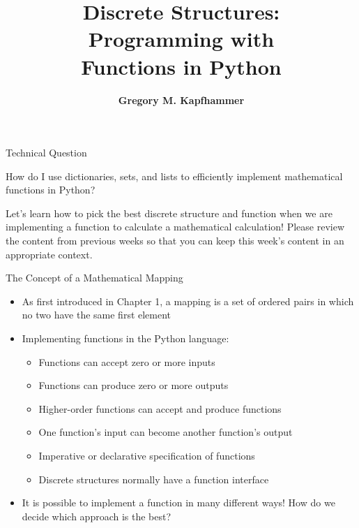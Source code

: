 \documentclass[14pt,aspectratio=169]{beamer}
\title{Discrete Structures: \\ Programming with \\ Functions in Python}
\author{{\bf Gregory M. Kapfhammer}}
\institute[shortinst]{{\bf Department of Computer Science, Allegheny College}}
\begin{document}
{
  \begin{frame}
    \titlepage
  \end{frame}
}

%
\begin{frame}{Technical Question}
  \hspace*{.5in}
  \begin{minipage}{4.3in}
    \vspace*{.1in}
    \begin{center}
      {\large How do I use dictionaries, sets, and lists to efficiently
      implement mathematical functions in Python?}
    \end{center}
  \end{minipage}
  \vspace{2ex}
  \begin{center}
    \small Let's learn how to pick the best discrete structure and function when
    we are implementing a function to calculate a mathematical calculation!
    Please review the content from previous weeks so that you can keep this
    week's content in an appropriate context.
  \end{center}
\end{frame}

%
\begin{frame}{The Concept of a Mathematical Mapping}
  \begin{itemize}
    \item As first introduced in Chapter 1, a mapping is a set of ordered pairs
      in which no two have the same first element
      \vspace*{-.15in}
    \item Implementing functions in the Python language:
      \begin{itemize}
        \item Functions can accept zero or more inputs
        \item Functions can produce zero or more outputs
        \item Higher-order functions can accept and produce functions
        \item One function's input can become another function's output
        \item Imperative or declarative specification of functions
        \item Discrete structures normally have a function interface
      \end{itemize}
      \vspace*{-.2in}
    \item It is possible to implement a function in many different ways! How do
      we decide which approach is the best?
  \end{itemize}
\end{frame}
\end{document}
